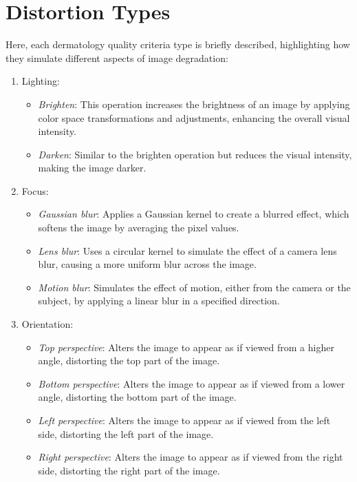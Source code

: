 \section{Distortion Types}
\label{sec:DistTypes}
Here, each dermatology quality criteria type is briefly described, highlighting how they simulate different aspects of image degradation: \par
\begin{enumerate}
    \item Lighting:
        \begin{itemize}
            \item \textit{Brighten}: This operation increases the brightness of an image by applying color space transformations and adjustments, enhancing the overall visual intensity.
            \item \textit{Darken}: Similar to the brighten operation but reduces the visual intensity, making the image darker.
        \end{itemize}
    \item Focus:
        \begin{itemize}
            \item \textit{Gaussian blur}: Applies a Gaussian kernel to create a blurred effect, which softens the image by averaging the pixel values.
            \item \textit{Lens blur}: Uses a circular kernel to simulate the effect of a camera lens blur, causing a more uniform blur across the image.
            \item \textit{Motion blur}: Simulates the effect of motion, either from the camera or the subject, by applying a linear blur in a specified direction.
        \end{itemize}
    \item Orientation:
        \begin{itemize}
            \item \textit{Top perspective}: Alters the image to appear as if viewed from a higher angle, distorting the top part of the image.
            \item \textit{Bottom perspective}: Alters the image to appear as if viewed from a lower angle, distorting the bottom part of the image.
            \item \textit{Left perspective}: Alters the image to appear as if viewed from the left side, distorting the left part of the image.
            \item \textit{Right perspective}: Alters the image to appear as if viewed from the right side, distorting the right part of the image.

\end{itemize}
\end{enumerate}
